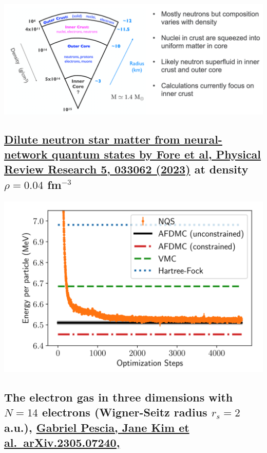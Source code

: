 \documentclass[%
oneside,                 %
final,                   %
10pt]{article}
\begin{document}
\centerline{\includegraphics[width=1.0\linewidth]{figures/mbpfig5.png}}

\vspace{6mm}

\subsection{\href{{https://journals.aps.org/prresearch/pdf/10.1103/PhysRevResearch.5.033062}}{Dilute neutron star matter from neural-network quantum states by Fore et al, Physical Review Research 5, 033062 (2023)} at density $\rho=0.04$ fm$^{-3}$}

\begin{block}{}

\vspace{6mm}

\centerline{\includegraphics[width=0.9\linewidth]{figures/nmatter.png}}

\vspace{6mm}

\end{block}

\subsection{The electron gas in three dimensions with $N=14$ electrons (Wigner-Seitz radius $r_s=2$ a.u.), \href{{https://doi.org/10.48550/arXiv.2305.07240}}{Gabriel Pescia, Jane Kim et al.~arXiv.2305.07240,}}
\end{document}
